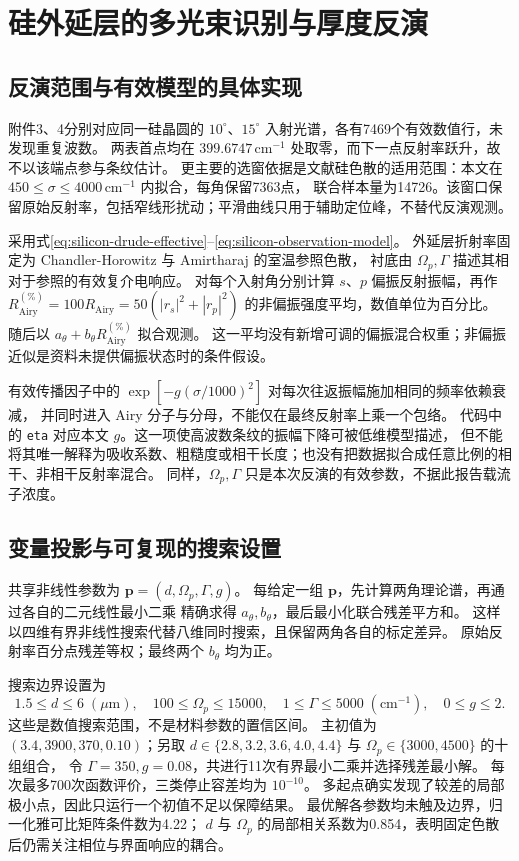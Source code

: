 \section{硅外延层的多光束识别与厚度反演}
\label{sec:silicon-results}

\subsection{反演范围与有效模型的具体实现}
附件3、4分别对应同一硅晶圆的 $10^\circ$、$15^\circ$ 入射光谱，各有7469个有效数值行，未发现重复波数。
两表首点均在 $399.6747\,\mathrm{cm}^{-1}$ 处取零，而下一点反射率跃升，故不以该端点参与条纹估计。
更主要的选窗依据是文献硅色散的适用范围：本文在
$450\leq\sigma\leq4000\,\mathrm{cm}^{-1}$ 内拟合，每角保留7363点，
联合样本量为14726。该窗口保留原始反射率，包括窄线形扰动；平滑曲线只用于辅助定位峰，不替代反演观测。

采用式\eqref{eq:silicon-drude-effective}--\eqref{eq:silicon-observation-model}。
外延层折射率固定为 Chandler-Horowitz 与 Amirtharaj 的室温参照色散\cite{ChandlerHorowitz2005}，
衬底由 $\Omega_p,\Gamma$ 描述其相对于参照的有效复介电响应。
对每个入射角分别计算 $s$、$p$ 偏振反射振幅，再作
$R_{\mathrm{Airy}}^{(\%)}=100R_{\mathrm{Airy}}=50(|r_s|^2+|r_p|^2)$ 的非偏振强度平均，数值单位为百分比。
随后以 $a_\theta+b_\theta R_{\mathrm{Airy}}^{(\%)}$ 拟合观测。
这一平均没有新增可调的偏振混合权重；非偏振近似是资料未提供偏振状态时的条件假设。

有效传播因子中的 $\exp[-g(\sigma/1000)^2]$ 对每次往返振幅施加相同的频率依赖衰减，
并同时进入 Airy 分子与分母，不能仅在最终反射率上乘一个包络。
代码中的 \texttt{eta} 对应本文 $g$。这一项使高波数条纹的振幅下降可被低维模型描述，
但不能将其唯一解释为吸收系数、粗糙度或相干长度；也没有把数据拟合成任意比例的相干、非相干反射率混合。
同样，$\Omega_p,\Gamma$ 只是本次反演的有效参数，不据此报告载流子浓度。

\subsection{变量投影与可复现的搜索设置}
共享非线性参数为 $\boldsymbol p=(d,\Omega_p,\Gamma,g)$。
每给定一组 $\boldsymbol p$，先计算两角理论谱，再通过各自的二元线性最小二乘
精确求得 $a_\theta,b_\theta$，最后最小化联合残差平方和。
这样以四维有界非线性搜索代替八维同时搜索，且保留两角各自的标定差异。
原始反射率百分点残差等权；最终两个 $b_\theta$ 均为正。

搜索边界设置为
\[
 1.5\leq d\leq6\;(\mu\mathrm m),\quad
 100\leq\Omega_p\leq15000,\quad
 1\leq\Gamma\leq5000\;(\mathrm{cm}^{-1}),\quad 0\leq g\leq2.
\]
这些是数值搜索范围，不是材料参数的置信区间。
主初值为 $(3.4,3900,370,0.10)$；另取
$d\in\{2.8,3.2,3.6,4.0,4.4\}$ 与
$\Omega_p\in\{3000,4500\}$ 的十组组合，
令 $\Gamma=350,g=0.08$，共进行11次有界最小二乘并选择残差最小解。
每次最多700次函数评价，三类停止容差均为 $10^{-10}$。
多起点确实发现了较差的局部极小点，因此只运行一个初值不足以保障结果。
最优解各参数均未触及边界，归一化雅可比矩阵条件数为4.22；
$d$ 与 $\Omega_p$ 的局部相关系数为0.854，表明固定色散后仍需关注相位与界面响应的耦合。

